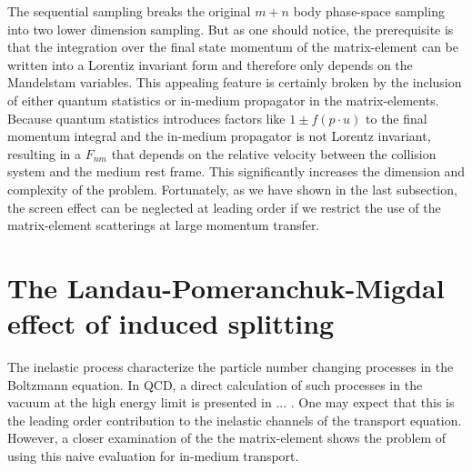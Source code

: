 The sequential sampling breaks the original $m+n$ body phase-space sampling into two lower dimension sampling.
But as one should notice, the prerequisite is that the integration over the final state momentum of the matrix-element can be written into a Lorentiz invariant form and therefore only depends on the Mandelstam variables.
This appealing feature is certainly broken by the inclusion of either
quantum statistics or in-medium propagator in the matrix-elements. 
Because quantum statistics introduces factors like $1\pm f(p\cdot u)$ to the final momentum integral and the in-medium propagator is not Lorentz invariant, resulting in a $F_{nm}$ that depends on the relative velocity between the collision system and the medium rest frame.
This significantly increases the dimension and complexity of the problem. 
Fortunately, as we have shown in the last subsection, the screen effect can be neglected at leading order if we restrict the use of the matrix-element scatterings at large momentum transfer. 

\section{The Landau-Pomeranchuk-Migdal effect of induced splitting}
The inelastic process characterize the particle number changing processes in the Boltzmann equation.
In QCD, a direct calculation of such processes in the vacuum at the high energy limit is presented in ... .
One may expect that this is the leading order contribution to the inelastic channels of the transport equation.
However, a closer examination of the the matrix-element shows the problem of using this naive evaluation for in-medium transport.

